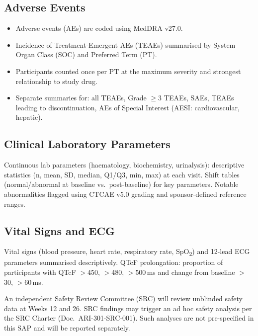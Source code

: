 \documentclass[11pt,a4paper]{article}
\begin{document}
\subsection{Adverse Events}

\begin{itemize}[leftmargin=1.6em, itemsep=2pt]
  \item Adverse events (AEs) are coded using MedDRA v27.0.
  \item Incidence of Treatment-Emergent AEs (TEAEs) summarised by System Organ Class
        (SOC) and Preferred Term (PT).
  \item Participants counted once per PT at the maximum severity and strongest relationship
        to study drug.
  \item Separate summaries for: all TEAEs, Grade $\geq$3 TEAEs, SAEs, TEAEs leading to
        discontinuation, AEs of Special Interest (AESI: cardiovascular, hepatic).
\end{itemize}

\subsection{Clinical Laboratory Parameters}

Continuous lab parameters (haematology, biochemistry, urinalysis): descriptive statistics
(n, mean, SD, median, Q1/Q3, min, max) at each visit. Shift tables (normal/abnormal at
baseline vs.\ post-baseline) for key parameters. Notable abnormalities flagged using
CTCAE v5.0 grading and sponsor-defined reference ranges.

\subsection{Vital Signs and ECG}

Vital signs (blood pressure, heart rate, respiratory rate, SpO\textsubscript{2}) and
12-lead ECG parameters summarised descriptively. QTcF prolongation: proportion of
participants with QTcF $>$450, $>$480, $>$500\,ms and change from baseline $>$30, $>$60\,ms.

\begin{tcolorbox}[sapwarn, title={\faIcon{exclamation-triangle}\ Safety Review Committee Note}]
  An independent Safety Review Committee (SRC) will review unblinded safety data at
  Weeks 12 and 26. SRC findings may trigger an ad hoc safety analysis per the SRC
  Charter (Doc.\ ARI-301-SRC-001). Such analyses are not pre-specified in this SAP
  and will be reported separately.
\end{tcolorbox}
\end{document}
